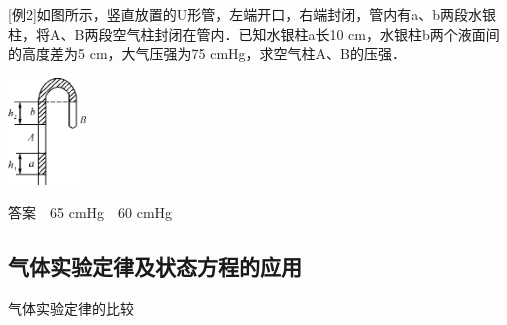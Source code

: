 {[}例2{]}如图所示，竖直放置的U形管，左端开口，右端封闭，管内有a、b两段水银柱，将A、B两段空气柱封闭在管内．已知水银柱a长10
cm，水银柱b两个液面间的高度差为5 cm，大气压强为75
cmHg，求空气柱A、B的压强．

\begin{center}\includegraphics[width=0.81111in,height=1.11319in]{media/image494.png}\end{center}
答案　65 cmHg　60 cmHg

\subsection{气体实验定律及状态方程的应用}

气体实验定律的比较

